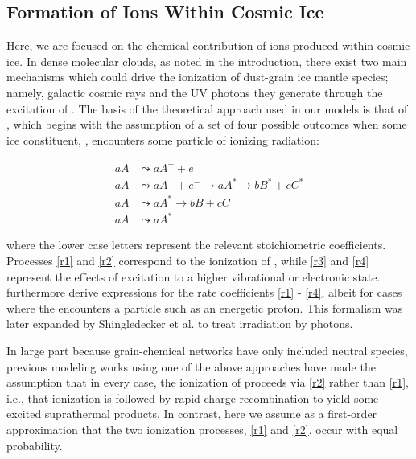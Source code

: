 \documentclass[journal=aesccq,manuscript=article,layout=twocolumn]{achemso}
\newcounter{ncounter}
\begin{document}
\subsection{Formation of Ions Within Cosmic Ice}\label{sec:ionformation}

Here, we are focused on the chemical contribution of ions produced within cosmic ice. In dense molecular clouds, as noted in the introduction, there exist two main mechanisms which could drive the ionization of dust-grain ice mantle species; namely, galactic cosmic rays\citep{silsbee_magnetic_2018,ivlev_penetration_2018} and the UV photons they generate through the excitation of \citep{prasad_uv_1983}. The basis of the theoretical approach used in our models is that of \citet{shingledecker_general_2018}, which begins with the assumption of a set of four possible outcomes when some ice constituent, , encounters some particle of ionizing radiation:

\begin{align}
    aA &\leadsto{} aA^+ + e^- 
\tag{R1}
\label{r1}\\
aA &\leadsto{} aA^+ + e^- \rightarrow{} aA^* \rightarrow{} bB^* + cC^* 
\tag{R2}
\label{r2}\\
aA &\leadsto{} aA^* \rightarrow{} bB + cC 
\tag{R3}
\label{r3}\\
aA &\leadsto{} aA^*
\tag{R4}
\label{r4}
\end{align}


\noindent
where the lower case letters represent the relevant stoichiometric coefficients. Processes \eqref{r1} and \eqref{r2} correspond to the ionization of , while \eqref{r3} and \eqref{r4} represent the effects of excitation to a higher vibrational or electronic state. \citet{shingledecker_general_2018} furthermore derive expressions for the rate coefficients \eqref{r1} - \eqref{r4}, albeit for cases where the  encounters a particle such as an energetic proton. This formalism was later expanded by Shingledecker et al. \citep{mullikin_new_2021} to treat irradiation by photons. 

In large part because grain-chemical networks have only included neutral species, previous modeling works using one of the above approaches have made the assumption that in every case, the ionization of  proceeds via \eqref{r2} rather than \eqref{r1}, i.e., that ionization is followed by rapid charge recombination to yield some excited suprathermal products. In contrast, here we assume as a first-order approximation that the two ionization processes, \eqref{r1} and \eqref{r2}, occur with equal probability.
\end{document}
